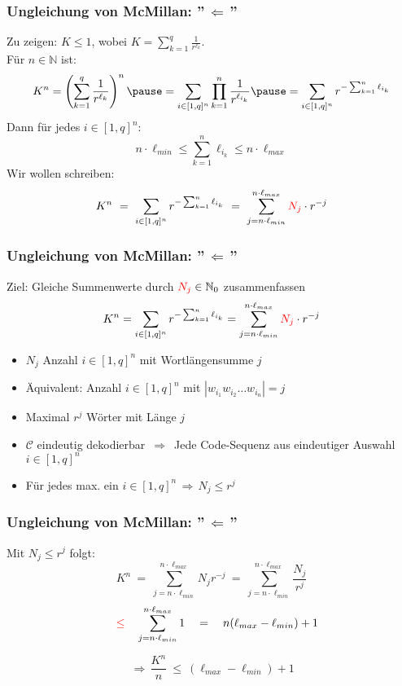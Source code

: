 \documentclass{beamer}
\begin{document}
\begin{frame}[t]
    \frametitle{Ungleichung von McMillan: ''$\,\Longleftarrow\,$''}
        Zu zeigen: $K \leq 1$, wobei
        $\displaystyle
            K = \sum_{k=1}^{q} \frac{1}{r^{\ell_k}}
        $.\\
        \pause
        Für $n \in \mathbb{N}$ ist:
        $$
            K^n = \left(\sum_{k=1}^{q} \frac{1}{r^{\ell_k}}\right)^n
            \pause
            = \sum_{i \in [1,q]^n} \prod_{k=1}^{n} \frac{1}{r^{\ell_{i_k}}}
            \pause
            = \sum_{i\in [1,q]^n} r^{-\sum_{k=1}^{n} \ell_{i_k}}
        $$\pause
        Dann für jedes $i \in [1,q]^n:$
        $$
            n\cdot \ell_{min} \leq \sum_{k=1}^{n} \ell_{i_k} \leq n\cdot \ell_{max}
        $$
        \pause
        Wir wollen schreiben:
        $$
            K^n
            \ =\ \sum_{i\in [1,q]^n} r^{-\sum_{k=1}^{n} \ell_{i_k}}
            \ =\ \sum_{j=n\cdot \ell_{min}}^{n\cdot \ell_{max}} {\color{red}N_j}\cdot r^{-j}
        $$
\end{frame}

\begin{frame}[t]
    \frametitle{Ungleichung von McMillan: ''$\,\Longleftarrow\,$''}
    Ziel: Gleiche Summenwerte durch ${\color{red}N_j} \in \mathbb{N}_0$ zusammenfassen
    $$
        K^n = \sum_{i\in [1,q]^n} r^{-\sum_{k=1}^{n} \ell_{i_k}}
        = \sum_{j=n\cdot\ell_{min}}^{n\cdot\ell_{max}} {\color{red}N_j} \cdot r^{-j}
    $$
    \pause

    \begin{itemize}
        \setlength\itemsep{1em}
        \item $N_j$ Anzahl $i \in [1,q]^n$ mit Wortlängensumme $j$
        \pause
        \item Äquivalent: Anzahl $i \in [1,q]^n$ mit $|w_{i_1}w_{i_2}\dots w_{i_n}| = j$
        \pause
        \item Maximal $r^j$ Wörter mit Länge $j$
        \pause
        \item $\mathcal{C}$ eindeutig dekodierbar
            $\,\Longrightarrow\,$ Jede Code-Sequenz aus eindeutiger Auswahl
                $i \in [1,q]^n$
        \pause
        \item Für jedes max. ein $i \in [1,q]^n \,\Longrightarrow\, N_j \leq r^j$
    \end{itemize}

\end{frame}

\begin{frame}[t]
    \frametitle{Ungleichung von McMillan: ''$\,\Longleftarrow\,$''}
        Mit {$N_j \leq r^j$} folgt:
        $$
            K^n
            \ =\ \sum_{j = n\cdot \ell_{min}}^{n\cdot \ell_{max}} N_jr^{-j}
            \ =\ \sum_{j = n\cdot\ell_{min}}^{n\cdot\ell_{max}} \frac{N_j}{r^j}
        $$
        \pause
        $$
            \quad{\color{red}\leq}\quad \sum_{j = n\cdot\ell_{min}}^{n\cdot\ell_{max}} 1
            \quad=\quad n(\ell_{max}-\ell_{min}) + 1
        $$
        \pause
        \strut
        $$
            \,\Longrightarrow\, \frac{K^n}{n}\ \leq\ (\ell_{max}-\ell_{min}) + 1
        $$
\end{frame}
\end{document}

